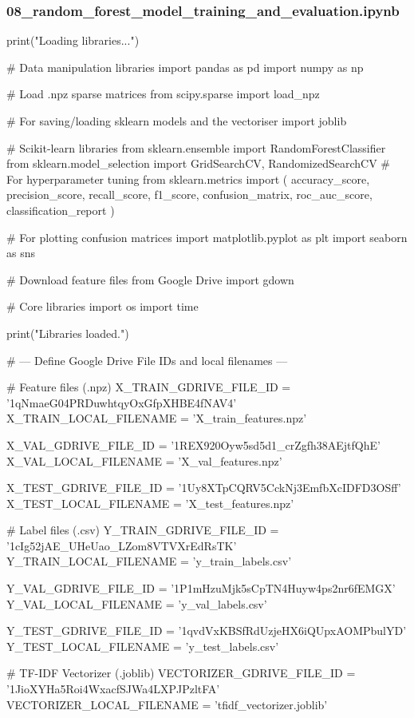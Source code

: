 \subsubsection*{08\_random\_forest\_model\_training\_and\_evaluation.ipynb}

\begin{ffcode}
print("Loading libraries...")

# Data manipulation libraries
import pandas as pd
import numpy as np

# Load .npz sparse matrices
from scipy.sparse import load_npz

# For saving/loading sklearn models and the vectoriser
import joblib

# Scikit-learn libraries
from sklearn.ensemble import RandomForestClassifier
from sklearn.model_selection import GridSearchCV, RandomizedSearchCV # For hyperparameter tuning
from sklearn.metrics import (
    accuracy_score,
    precision_score,
    recall_score,
    f1_score,
    confusion_matrix,
    roc_auc_score,
    classification_report
)

# For plotting confusion matrices
import matplotlib.pyplot as plt
import seaborn as sns

# Download feature files from Google Drive
import gdown

# Core libraries
import os
import time

print("Libraries loaded.")

# --- Define Google Drive File IDs and local filenames ---

# Feature files (.npz)
X_TRAIN_GDRIVE_FILE_ID = '1qNmaeG04PRDuwhtqyOxGfpXHBE4fNAV4'
X_TRAIN_LOCAL_FILENAME = 'X_train_features.npz'

X_VAL_GDRIVE_FILE_ID = '1REX920Oyw5sd5d1_crZgfh38AEjtfQhE'
X_VAL_LOCAL_FILENAME = 'X_val_features.npz'

X_TEST_GDRIVE_FILE_ID = '1Uy8XTpCQRV5CckNj3EmfbXcIDFD3OSff'
X_TEST_LOCAL_FILENAME = 'X_test_features.npz'

# Label files (.csv)
Y_TRAIN_GDRIVE_FILE_ID = '1cIg52jAE_UHeUao_LZom8VTVXrEdRsTK'
Y_TRAIN_LOCAL_FILENAME = 'y_train_labels.csv'

Y_VAL_GDRIVE_FILE_ID = '1P1mHzuMjk5sCpTN4Huyw4ps2nr6fEMGX'
Y_VAL_LOCAL_FILENAME = 'y_val_labels.csv'

Y_TEST_GDRIVE_FILE_ID = '1qvdVxKBSfRdUzjeHX6iQUpxAOMPbulYD'
Y_TEST_LOCAL_FILENAME = 'y_test_labels.csv'

# TF-IDF Vectorizer (.joblib)
VECTORIZER_GDRIVE_FILE_ID = '1JioXYHa5Roi4WxacfSJWa4LXPJPzltFA'
VECTORIZER_LOCAL_FILENAME = 'tfidf_vectorizer.joblib'


\end{ffcode}
